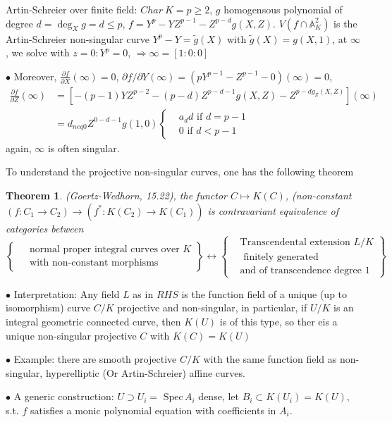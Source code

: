 \documentclass[11pt]{article}
\newtheorem{thm}{Theorem}[section]
\newcommand{\spec}{\text{ Spec}\,}
\newcommand{\affn}{\mathbb A}
\newcommand{\pd}{\partial}
\newcommand{\Lrta}{\Longrightarrow}
\newcommand{\lrta}{\longrightarrow}
\newcommand{\llrta}{\longleftrightarrow}
\begin{document}
Artin-Schreier over finite field: $Char\  K=p\geq 2$, $g$ homogensous polynomial of degree $d=\deg_X g=d\leq p$, $f=Y^p-YZ^{p-1}-Z^{p-d}g(X,Z)$.
$V(f\cap \affn^2_K)$ is the Artin-Schreier non-singular curve $Y^p-Y=\tilde{g}(X)$ with $\tilde{g}(X)=g(X,1)$, at $\infty$, we solve with $z=0:Y^p=0$, $\Lrta \infty=[1:0:0]$

$\bullet$ Moreover, $\frac{\pd f}{\pd X}(\infty)=0$, $\pd f/\pd Y(\infty)=(pY^{p-1}-Z^{p-1}-0)(\infty)=0$, 
$$
\begin{aligned}
\frac{\pd f}{\pd Z}(\infty)
&=[-(p-1)YZ^{p-2}-(p-d)Z^{p-d-1}g(X,Z)-Z^{p-dg_Z(X,Z)}](\infty)\\
&= d_{neq 0} Z^{0-d-1} g(1,0)\left\{\begin{aligned}
&a_d d \text{ if } d=p-1\\
&0\text{ if } d< p-1
\end{aligned}\right.
\end{aligned}
$$
again, $\infty$ is often singular.

To understand the projective non-singular curves, one has the following theorem
\begin{thm}
(Goertz-Wedhorn, 15.22), the functor
$C\mapsto K(C)$, (non-constant $(f:C_1\lrta C_2)\lrta (f^*:K(C_2)\lrta K(C_1))$ is contravariant equivalence of categories between
$$
\left\{\begin{aligned}
&\text{ normal proper integral curves over $K$}\\
&\text{ with non-constant morphisms}
\end{aligned}\right\}
\llrta 
\left\{\begin{aligned}
&\text{Transcendental extension $L/K$}\\
&\text{ finitely generated}\\ 
&\text{and of transcendence degree $1$}
\end{aligned}\right\}
$$
\end{thm}
$\bullet$ Interpretation: Any field $L$ as in $RHS$ is the function field of a unique (up  to isomorphism) curve $C/K$ projective and non-singular, in particular, if $U/K$ is an integral geometric connected curve, then $K(U)$ is of this type, so ther eis a unique non-singular projective $C$ with $K(C)=K(U)$

$\bullet$ Example: there are smooth projective $C/K$ with the same function field as non-singular, hyperelliptic (Or Artin-Schreier) affine curves.

$\bullet$ A generic construction:
$U\supset U_i =\spec A_i$ dense, let $B_i\subset K(U_i)=K(U)$, s.t. $f$ satisfies a monic polynomial equation with coefficients in $A_i$.
\end{document}
